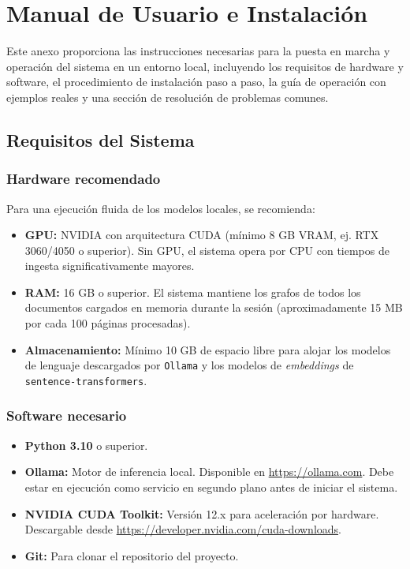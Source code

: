 \chapter{Manual de Usuario e Instalación}
\label{ape:manual}

Este anexo proporciona las instrucciones necesarias para la puesta en marcha y operación del sistema en un entorno local, incluyendo los requisitos de hardware y software, el procedimiento de instalación paso a paso, la guía de operación con ejemplos reales y una sección de resolución de problemas comunes.

\section{Requisitos del Sistema}

\subsection{Hardware recomendado}
Para una ejecución fluida de los modelos locales, se recomienda:
\begin{itemize}
    \item \textbf{GPU:} NVIDIA con arquitectura CUDA (mínimo 8 GB VRAM, ej. RTX 3060/4050 o superior). Sin GPU, el sistema opera por CPU con tiempos de ingesta significativamente mayores.
    \item \textbf{RAM:} 16 GB o superior. El sistema mantiene los grafos de todos los documentos cargados en memoria durante la sesión (aproximadamente 15 MB por cada 100 páginas procesadas).
    \item \textbf{Almacenamiento:} Mínimo 10 GB de espacio libre para alojar los modelos de lenguaje descargados por \texttt{Ollama} y los modelos de \textit{embeddings} de \texttt{sentence-transformers}.
\end{itemize}

\subsection{Software necesario}
\begin{itemize}
    \item \textbf{Python 3.10} o superior.
    \item \textbf{Ollama:} Motor de inferencia local. Disponible en \url{https://ollama.com}. Debe estar en ejecución como servicio en segundo plano antes de iniciar el sistema.
    \item \textbf{NVIDIA CUDA Toolkit:} Versión 12.x para aceleración por hardware. Descargable desde \url{https://developer.nvidia.com/cuda-downloads}.
    \item \textbf{Git:} Para clonar el repositorio del proyecto.
\end{itemize}

